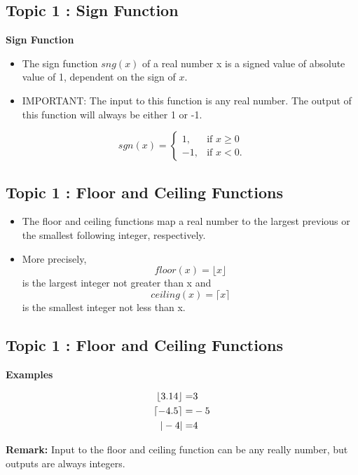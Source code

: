 \documentclass[a4paper,12pt]{article}
\begin{document}
\subsection{Topic 1 : Sign Function}

\textbf{Sign Function}
\begin{itemize}
\item The sign function $sng(x)$ of a real number x is a signed value of absolute value of 1, dependent on the sign of $x$. 

\item IMPORTANT:  The input to this function is any real number. The output of this function will always be either 1 or -1.
\end{itemize}
\[ sgn(x) = \begin{cases} 1, & \mbox{if }  x \ge 0  \\ -1,  & \mbox{if } x < 0. \end{cases} \]


\subsection{Topic 1 : Floor and Ceiling Functions}

\begin{itemize}
\item The floor and ceiling functions map a real number to the largest previous or the smallest following integer, respectively. \item More precisely, \[floor(x) = \lfloor x\rfloor \] is the largest integer not greater than x and \[ceiling(x) =  \lceil x \rceil \] is the smallest integer not less than x.
\end{itemize}





\subsection{Topic 1 : Floor and Ceiling Functions}
\textbf{Examples}
{

\begin{eqnarray}
\lfloor 3.14 \rfloor =& 3 \\ \bigskip
\lceil -4.5 \rceil =& -5 \\ \bigskip
| -4 | =&  4
\end{eqnarray}
}
{
\textbf{Remark:}  Input to the floor and ceiling function can be any really number, but outputs are always integers.
}
\end{document}
